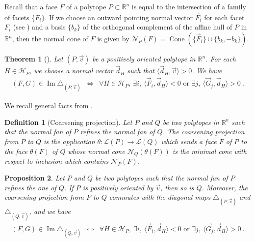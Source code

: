 \documentclass[twoside, 12pt]{amsart}
\newtheorem{definition}{Definition}[section]
\newtheorem{proposition}[definition]{Proposition}
\newtheorem{theorem}{Theorem}
\theoremstyle{remark}
\newcommand{\RR}{\mathbb{R}}
\DeclareMathOperator{\Ima}{Im} %
\DeclareMathOperator{\cone}{Cone} %
\begin{document}
Recall that a face $F$ of a polytope $P \subset \RR^n$ is equal to the intersection of a family of facets $\{F_i\}$. 
If we choose an outward pointing normal vector $\vec F_i$ for each facet $F_i$ (see \cite[Definition 1.24]{LA21}) and a basis $\{b_k\}$ of the orthogonal complement of the affine hull of $P$ in $\RR^n$, then the normal cone of $F$ is given by $\mathcal{N}_P(F)=\cone(\{\vec F_i\} \cup \{b_k,-b_k\})$. 

\begin{theorem}[{\cite[Theorem 1.23]{LA21}}]
  \label{thm:universalformula} 
  Let $(P,\vec v)$ be a positively oriented polytope in $\RR^n$. For each $H\in\mathcal{H}_P$, we choose a normal vector $\vec d_H$ such that $\langle \vec d_H, \vec v \rangle >0$. We have 
\begin{eqnarray*}
  (F,G) \in \Ima \triangle_{(P,\vec v)} 
  &\iff&  \forall H \in \mathcal{H}_P , \ \exists i , \ \langle \vec F_i, \vec d_H \rangle < 0  \text{ or } \exists j , \ \langle \vec G_j, \vec d_H \rangle > 0 \ . 
\end{eqnarray*} 
\end{theorem}

We recall general facts from \cite[Section 1.6]{LA21}. 

\begin{definition}[Coarsening projection] 
  \label{def:coarseningprojection} 
  Let $P$ and $Q$ be two polytopes in $\RR^n$ such that the normal fan of $P$ refines the normal fan of $Q$. 
  The \emph{coarsening projection} from $P$ to $Q$ is the application $\theta : \mathcal{L}(P)\to\mathcal{L}(Q)$ which sends a face $F$ of $P$ to the face $\theta(F)$ of $Q$ whose normal cone $\mathcal{N}_Q(\theta(F))$ is the minimal cone with respect to inclusion which contains $\mathcal{N}_P(F)$.
\end{definition}

\begin{proposition} 
\label{prop:refinementofnormalfans}
Let $P$ and $Q$ be two polytopes such that the normal fan of $P$ refines the one of $Q$. 
If $P$ is positively oriented by $\vec v$, then so is $Q$. 
Moreover, the coarsening projection from $P$ to $Q$ commutes with the diagonal maps $\triangle_{(P,\vec v)}$ and $\triangle_{(Q,\vec v)}$, and we have 
\begin{eqnarray*}
  (F,G) \in \Ima \triangle_{(Q,\vec v)} 
  &\iff& \forall H \in \mathcal{H}_P , \ \exists i , \ \langle \vec F_i, \vec d_H \rangle < 0  \text{ or } \exists j , \ \langle \vec G_j, \vec d_H \rangle > 0 \ .
\end{eqnarray*} 
\end{proposition}
\end{document}
